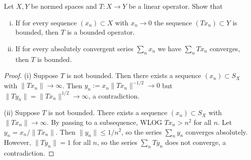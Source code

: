 \documentclass{article}
\begin{document}
 Let $X, Y$ be normed spaces and $T: X \to Y$ be a linear operator. Show that 
\begin{enumerate}[(i)]
\item If for every sequence $(x_n) \subset X$ with $x_n \to 0$ the sequence $(Tx_n) \subset Y$ is bounded, then $T$ is a bounded operator.
\item If for every absolutely convergent series $\sum_n x_n$ we have $\sum_n Tx_n$ converges, then $T$ is bounded.
\end{enumerate}

\begin{proof}
(i) Suppose $T$ is not bounded.  Then there exists a sequence $(x_n) \subset S_X$ with $\|Tx_n\| \to \infty$.  Then $y_n := x_n \|Tx_n\|^{-1/2} \to 0$ but
$\|Ty_n\| = \|Tx_n\|^{1/2} \to \infty$, a contradiction.

(ii) Suppose $T$ is not bounded.  There exists a sequence $(x_n) \subset S_X$ with $\|Tx_n\| \to \infty$. By passing to a subsequence, WLOG $Tx_n > n^2$ for all $n$. Let $y_n = x_n/\|Tx_n\|$.  Then $\|y_n\| \le  1/n^2$, so the series $\sum_n y_n$ converges absolutely.  However, $\|Ty_n\| = 1$ for all $n$, so the series $\sum_n Ty_n$ does not converge, a contradiction.
\end{proof}
\end{document}
